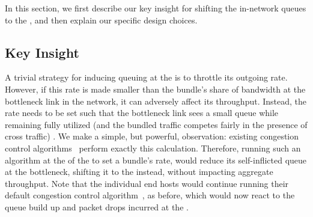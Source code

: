 
In this section, we first describe our key insight for shifting the in-network queues to the \name, and then explain our specific design choices. 

\subsection{Key Insight}


A trivial strategy for inducing queuing at the \name is to throttle its outgoing rate. However, if this rate is made smaller than the bundle's share of bandwidth at the bottleneck link in the network, it can adversely affect its throughput. Instead, the rate needs to be set such that the bottleneck link sees a small queue while remaining fully utilized (and the bundled traffic competes fairly in the presence of cross traffic) . We make a simple, but powerful, observation: existing congestion control algorithms~\cite{nimbus, copa} perform exactly this calculation. Therefore, running such an algorithm at the \inbox of the \name to set a bundle's rate, would reduce its self-inflicted queue at the bottleneck, shifting it to the \inbox instead, without impacting aggregate throughput. Note that the individual end hosts would continue running their default congestion control algorithm~\cite{cubic, bbr}, as before, which would now react to the queue build up and packet drops incurred at the \inbox.


